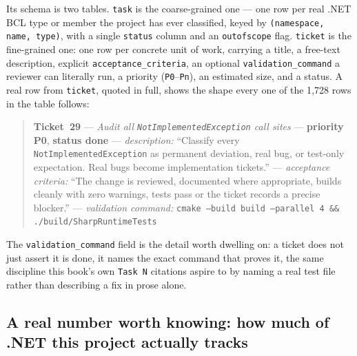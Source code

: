 Its schema is two tables. \texttt{task} is the coarse-grained one --- one row per real .NET
BCL type or member the project has ever classified, keyed by \texttt{(namespace, name, type)},
with a single \texttt{status} column and an \texttt{outofscope} flag. \texttt{ticket} is the
fine-grained one: one row per concrete unit of work, carrying a title, a free-text description,
explicit \texttt{acceptance\_criteria}, an optional \texttt{validation\_command} a reviewer can
literally run, a priority (\texttt{P0}--\texttt{Pn}), an estimated size, and a status. A real
row from \texttt{ticket}, quoted in full, shows the shape every one of the 1{,}728 rows in the
table follows:

\begin{quote}
\small
\textbf{Ticket~29} --- \emph{Audit all \texttt{NotImplementedException} call sites} ---
\textbf{priority P0}, \textbf{status done} --- \emph{description:} ``Classify every
\texttt{NotImplementedException} as permanent deviation, real bug, or test-only expectation.
Real bugs become implementation tickets.'' --- \emph{acceptance criteria:} ``The change is
reviewed, documented where appropriate, builds cleanly with zero warnings, tests pass or the
ticket records a precise blocker.'' --- \emph{validation command:} \texttt{cmake --build build
--parallel 4 \&\& ./build/SharpRuntimeTests}
\end{quote}

The \texttt{validation\_command} field is the detail worth dwelling on: a ticket does not just
assert it is done, it names the exact command that proves it, the same discipline this book's
own \texttt{Task~N} citations aspire to by naming a real test file rather than describing a fix
in prose alone.

\subsection{A real number worth knowing: how much of .NET this project actually tracks}


